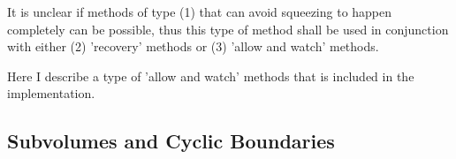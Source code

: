 \documentclass[english]{article}
\begin{document}
It is unclear if methods of type (1) that can avoid squeezing to
happen completely can be possible, thus this type of method shall be used in
conjunction with either (2) 'recovery' methods or (3) 'allow and
watch' methods.

Here I describe a type of 'allow and watch' methods that is included
in the implementation.



\subsection{Subvolumes and Cyclic Boundaries}
\end{document}

